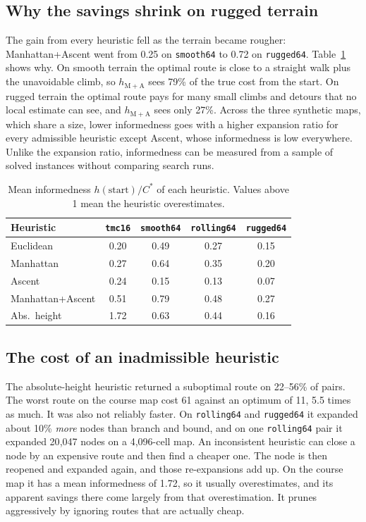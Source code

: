\documentclass[11pt]{article}
\newcommand{\hMA}{h_{\mathrm{M+A}}}
\begin{document}
\subsection{Why the savings shrink on rugged terrain}
The gain from every heuristic fell as the terrain became rougher: Manhattan+Ascent went from 0.25 on \texttt{smooth64} to 0.72 on \texttt{rugged64}. Table~\ref{tab:informedness} shows why. On smooth terrain the optimal route is close to a straight walk plus the unavoidable climb, so $\hMA$ sees 79\% of the true cost from the start. On rugged terrain the optimal route pays for many small climbs and detours that no local estimate can see, and $\hMA$ sees only 27\%. Across the three synthetic maps, which share a size, lower informedness goes with a higher expansion ratio for every admissible heuristic except Ascent, whose informedness is low everywhere. Unlike the expansion ratio, informedness can be measured from a sample of solved instances without comparing search runs.

\begin{table}[t]
\centering
\caption{Mean informedness $h(\text{start})/C^*$ of each heuristic. Values above 1 mean the heuristic overestimates.}
\label{tab:informedness}
\begin{tabular}{lcccc}
\toprule
Heuristic & \texttt{tmc16} & \texttt{smooth64} & \texttt{rolling64} & \texttt{rugged64} \\
\midrule
Euclidean & 0.20 & 0.49 & 0.27 & 0.15 \\
Manhattan & 0.27 & 0.64 & 0.35 & 0.20 \\
Ascent & 0.24 & 0.15 & 0.13 & 0.07 \\
Manhattan+Ascent & 0.51 & 0.79 & 0.48 & 0.27 \\
Abs.\ height & 1.72 & 0.63 & 0.44 & 0.16 \\
\bottomrule
\end{tabular}
\end{table}

\subsection{The cost of an inadmissible heuristic}
The absolute-height heuristic returned a suboptimal route on 22--56\% of pairs. The worst route on the course map cost 61 against an optimum of 11, 5.5 times as much. It was also not reliably faster. On \texttt{rolling64} and \texttt{rugged64} it expanded about 10\% \emph{more} nodes than branch and bound, and on one \texttt{rolling64} pair it expanded 20{,}047 nodes on a 4{,}096-cell map. An inconsistent heuristic can close a node by an expensive route and then find a cheaper one. The node is then reopened and expanded again, and those re-expansions add up. On the course map it has a mean informedness of 1.72, so it usually overestimates, and its apparent savings there come largely from that overestimation. It prunes aggressively by ignoring routes that are actually cheap.
\end{document}

